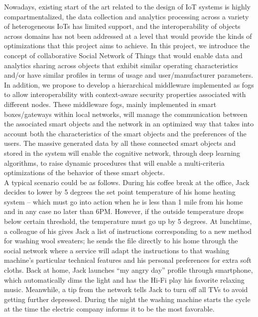 Nowadays, existing start of the art related to the design of IoT systems is highly compartmentalized, the data collection and analytics processing across a variety of heterogeneous IoTs has limited support, and the interoperability of objects across domains has not been addressed at a level that would provide the kinds of optimizations that this project aims to achieve. In this project, we introduce the concept of collaborative Social Network of Things that would enable data and analytics sharing across objects that exhibit similar operating characteristics and/or have similar profiles in terms of usage and user/manufacturer parameters. In addition, we propose to develop a hierarchical middleware implemented as fogs to allow interoperability with context-aware security properties associated with different nodes. These middleware fogs, mainly implemented in smart boxes/gateways within local networks, will manage the communication between the associated smart objects and the network in an optimized way that takes into account both the characteristics of the smart objects and the preferences of the users. The massive generated data by all these connected smart objects and stored in the system will enable the cognitive network, through deep learning algorithms, to raise dynamic procedures that will enable a multi-criteria optimizations of the  behavior  of these smart objects.\\

A typical scenario could be as follows. During his  coffee break at the office, Jack decides to lower by 5 degrees the set point temperature of his home heating system – which must go into action when he is less than 1 mile from his home and in any case no later than 6PM. However, if the outside temperature drops below certain threshold, the temperature must go up by 5 degrees. At lunchtime, a colleague of his gives Jack a list of instructions corresponding to a new method for washing wool sweaters; he  sends the file directly to his home through the social network where a service will adapt the instructions to that washing machine’s particular technical features and his personal preferences for extra soft cloths. Back at home, Jack launches “my angry day” profile through  smartphone, which automatically dims the light and has the Hi-Fi play his favorite relaxing music. Meanwhile, a tip from the network tells Jack to turn off all TVs to avoid getting further depressed. During the night the washing machine starts the cycle at the time the electric company informs it to be the most favorable.\\

